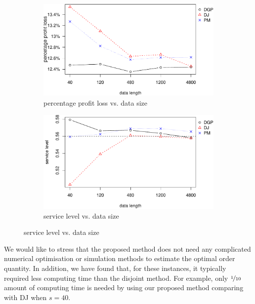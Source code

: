 \documentclass{article}
\begin{document}
\begin{figure}[ht]
\centering
\caption{Performance vs. data size with nonlinear profit function}
\begin{subfigure}[b]{0.48\textwidth}
\centering
\includegraphics[width=\textwidth]{nonlinear-plot_files/figure-latex/ppl-1.pdf}
\caption{percentage profit loss vs. data size}
\end{subfigure}
\hfill
\begin{subfigure}[b]{0.48\textwidth}
\centering
\includegraphics[width=\textwidth]{nonlinear-plot_files/figure-latex/sl-1.pdf}
\caption{service level vs. data size}
\end{subfigure}
\label{fig:non}
\end{figure}

We would like to stress that the proposed method does not need any complicated numerical optimisation or simulation methods to estimate the optimal order quantity. In addition, we have found that, for these instances, it typically required less computing time than the disjoint method. For example, only $\nicefrac{1}{10}$ amount of computing time is needed by using our proposed method comparing with DJ when $s=40$.
 
\end{document}
